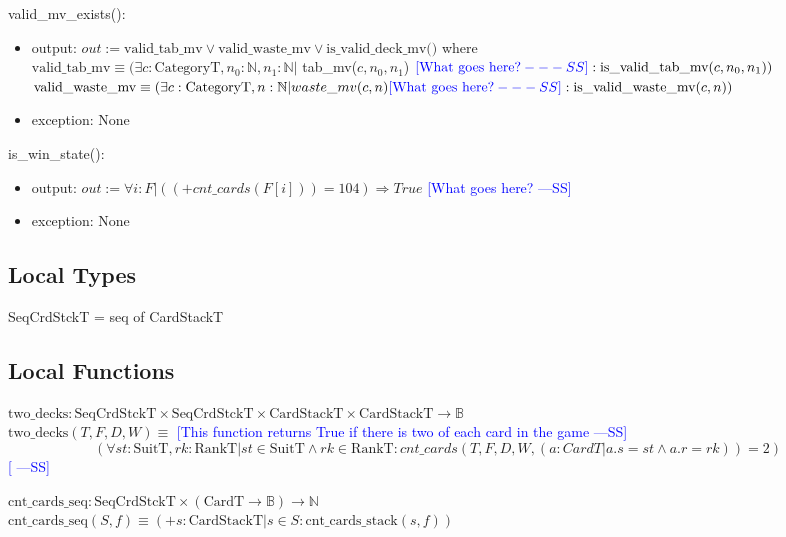\documentclass[12pt]{article}
\newcommand{\authornote}[3]{\textcolor{#1}{[#3 ---#2]}}
\newcommand{\authornote}[3]{}
\newcommand{\wss}[1]{\authornote{blue}{SS}{#1}}
\begin{document}
\noindent valid\_mv\_exists():
\begin{itemize}
\item output: $out := \text{valid\_tab\_mv} \vee \text{valid\_waste\_mv} \vee
  \text{is\_valid\_deck\_mv()}$ where\\

  $\text{valid\_tab\_mv} \equiv (\exists c: \text{CategoryT}, n_0: \mathbb{N},
  n_1: \mathbb{N} | $ tab\_mv($c, n_0, n_1$)  $\wss{\text{What goes here?}}: \text{is\_valid\_tab\_mv}(c, n_0, n_1))$\\

  $\text{valid\_waste\_mv} \equiv (\exists c: \text{CategoryT}, n: \mathbb{N} | waste\_mv(c, n) \wss{\text{What goes here?}} : \text{is\_valid\_waste\_mv}(c, n))$

\item exception: None

\end{itemize}

\noindent is\_win\_state():
\begin{itemize}
\item output: $out := \forall i : F | ((+ cnt\_cards(F[i])) = 104) \Rightarrow True  $ \wss{What goes here?}
\item exception: None

\end{itemize}

\subsection*{Local Types}

SeqCrdStckT = seq of CardStackT

\subsection*{Local Functions}

\noindent $\text{two\_decks} : \text{SeqCrdStckT} \times \text{SeqCrdStckT}
\times \text{CardStackT} \times \text{CardStackT} \rightarrow \mathbb{B}$\\
\noindent
$\text{two\_decks}(T, F, D, W) \equiv $ \wss{This function returns True if there
  is two of each card in the game}
$$(\forall \mathit{st}: \text{SuitT}, \mathit{rk}:
\text{RankT} | \mathit{st} \in \text{SuitT} \wedge \mathit{rk} \in \text{RankT}
: cnt\_cards(T,F,D,W, (a : CardT | a.s = st \land a.r = rk)) = 2 
 )$$\wss{}

\noindent $\text{cnt\_cards\_seq}: \text{SeqCrdStckT} \times (\text{CardT}
\rightarrow \mathbb{B}) \rightarrow \mathbb{N}$\\
\noindent $\text{cnt\_cards\_seq}(S, f) \equiv (+ s: \text{CardStackT} | s \in S :
\text{cnt\_cards\_stack}(s, f))$\\
\end{document}
